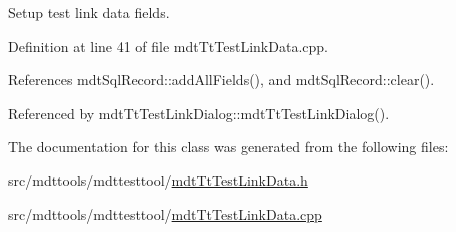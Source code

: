 Setup test link data fields. 



Definition at line 41 of file mdt\-Tt\-Test\-Link\-Data.\-cpp.



References mdt\-Sql\-Record\-::add\-All\-Fields(), and mdt\-Sql\-Record\-::clear().



Referenced by mdt\-Tt\-Test\-Link\-Dialog\-::mdt\-Tt\-Test\-Link\-Dialog().



The documentation for this class was generated from the following files\-:\begin{DoxyCompactItemize}
\item 
src/mdttools/mdttesttool/\hyperlink{mdt_tt_test_link_data_8h}{mdt\-Tt\-Test\-Link\-Data.\-h}\item 
src/mdttools/mdttesttool/\hyperlink{mdt_tt_test_link_data_8cpp}{mdt\-Tt\-Test\-Link\-Data.\-cpp}\end{DoxyCompactItemize}
